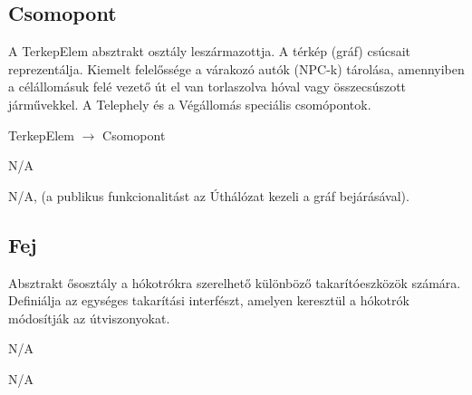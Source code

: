 \subsection{Csomopont}
\begin{class-template-responsibility}
  A TerkepElem absztrakt osztály leszármazottja. A térkép (gráf) csúcsait reprezentálja. Kiemelt felelőssége a várakozó autók (NPC-k) tárolása, amennyiben a célállomásuk felé vezető út el van torlaszolva hóval vagy összecsúszott járművekkel. A Telephely és a Végállomás speciális csomópontok.
\end{class-template-responsibility}
\begin{class-template-baseclass}
    TerkepElem $\rightarrow$ Csomopont
\end{class-template-baseclass}
\begin{class-template-interface}
    N/A
\end{class-template-interface}
\begin{class-template-attribute}
\end{class-template-attribute}
\begin{class-template-method}
    N/A, (a publikus funkcionalitást az Úthálózat kezeli a gráf bejárásával).
\end{class-template-method}

\subsection{Fej}
\begin{class-template-responsibility}
   Absztrakt ősosztály a hókotrókra szerelhető különböző takarítóeszközök számára. Definiálja az egységes takarítási interfészt, amelyen keresztül a hókotrók módosítják az útviszonyokat.
\end{class-template-responsibility}
\begin{class-template-baseclass}
    N/A
\end{class-template-baseclass}
\begin{class-template-interface}
    N/A
\end{class-template-interface}
\begin{class-template-attribute}
\end{class-template-attribute}
\begin{class-template-method}
\end{class-template-method}

